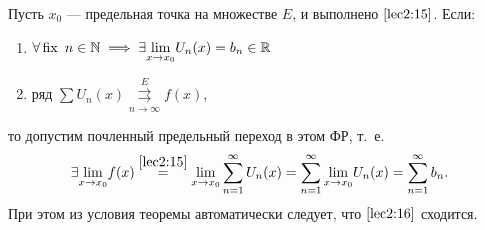 \documentclass[../../main.tex]{subfiles}
\begin{document}
\begin{thm}
Пусть $x_0$ --- предельная точка на множестве $E$, и выполнено 
$\eqref{lec2:15}$. Если: 
\begin{enumerate}
	\item $\forall \operatorname{fix} \ n \in \mathbb{N} \implies
\exists \underset{x \to x_0}{\lim} U_n(x) = b_n \in \mathbb{R}$
	\item ряд $\sum U_n(x) \overset{E}
	{\underset{n \to \infty}\rightrightarrows} f(x)$,
\end{enumerate}
то допустим почленный предельный переход в этом ФР, т.~е.
\begin{equation}
\label{lec2:16}
\exists \underset{x \to x_0}{\lim} f(x) \overset{\eqref{lec2:15}}{=}
\underset{x \to x_0}{\lim} \sum\limits_{n = 1}^{\infty} U_n(x) =
\sum\limits_{n = 1}^{\infty} \underset{x \to x_0}{\lim} U_n(x) =
\sum\limits_{n = 1}^{\infty} b_n.
\end{equation}	
При этом из условия теоремы автоматически следует, 
что $\eqref{lec2:16}$ сходится.
\end{thm}	
\end{document}
